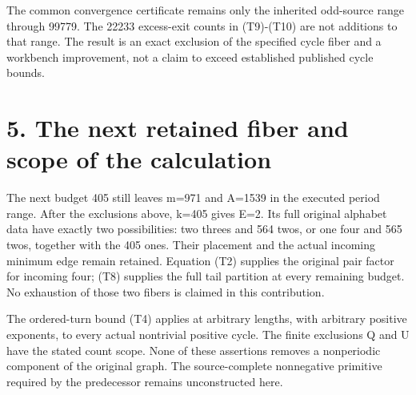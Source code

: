The common convergence certificate remains only the inherited odd-source
range through 99779. The 22233 excess-exit counts in (T9)-(T10) are not
additions to that range. The result is an exact exclusion of the
specified cycle fiber and a workbench improvement, not a claim to exceed
established published cycle bounds.

\section{5. The next retained fiber and scope of the calculation}

The next budget 405 still leaves m=971 and A=1539 in the executed period
range. After the exclusions above, k=405 gives E=2. Its full original
alphabet data have exactly two possibilities: two threes and 564 twos,
or one four and 565 twos, together with the 405 ones. Their placement
and the actual incoming minimum edge remain retained. Equation (T2)
supplies the original pair factor for incoming four; (T8) supplies the
full tail partition at every remaining budget. No exhaustion of those
two fibers is claimed in this contribution.

The ordered-turn bound (T4) applies at arbitrary lengths, with arbitrary
positive exponents, to every actual nontrivial positive cycle. The
finite exclusions Q and U have the stated count scope. None of these
assertions removes a nonperiodic component of the original graph. The
source-complete nonnegative primitive required by the predecessor
remains unconstructed here.
